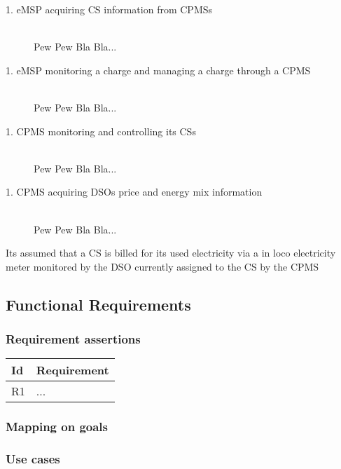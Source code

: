 \documentclass[11pt]{article}
\begin{document}
\begin{description}
    \item [1. eMSP acquiring CS information from CPMSs] \hfill \\
        Pew Pew Bla Bla...
    \item [1. eMSP monitoring a charge and managing a charge through a CPMS] \hfill \\
        Pew Pew Bla Bla...
    \item [1. CPMS monitoring and controlling its CSs] \hfill \\
        Pew Pew Bla Bla...
    \item [1. CPMS acquiring DSOs price and energy mix information] \hfill \\
        Pew Pew Bla Bla...
\end{description}

Its assumed that a CS is billed for its used electricity via a in loco electricity meter monitored by the DSO currently assigned to the CS by the CPMS

\subsection{Functional Requirements}

\subsubsection{Requirement assertions}

\begin{table}[H]
    \centering
    \setlength{\tabcolsep}{18pt}
    \renewcommand{\arraystretch}{1.2}
    \begin{tabularx}{\textwidth}{|>{\centering\hsize=0.1\hsize}X|>{\hsize=1.9\hsize}X|}
        \hline
        \textbf{Id} & \textbf{Requirement} \\
        \hline
        R1 & ... \\
        \hline
    \end{tabularx}
    \label{tab:requirements}
\end{table}

\subsubsection{Mapping on goals}

\subsubsection{Use cases}
\end{document}
